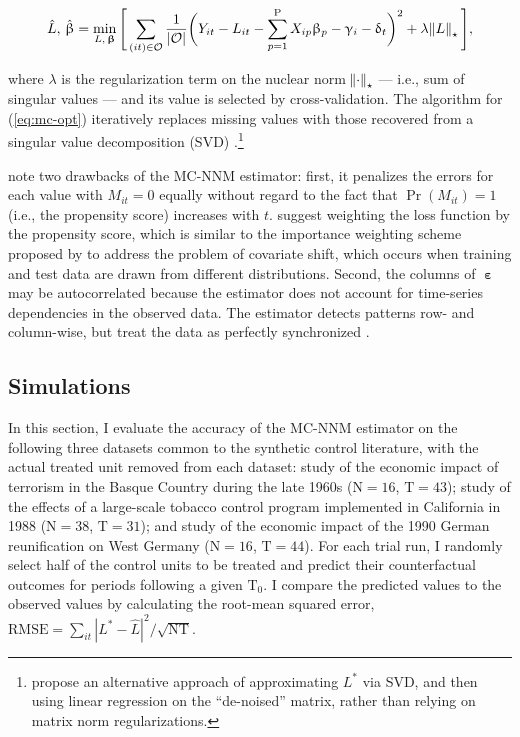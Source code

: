 \begin{equation}
\hat{L}, \, \hat{\upbeta} = \min_{L, \,\boldsymbol{\upbeta}} \Bigg[\sum_{(it) \in \mathcal{O}} \frac{1}{|\mathcal{O}|} \bigg(Y_{it} - L_{it} - \sum_{p=1}^{\text{P}} X_{ip} \upbeta_p - \upgamma_{i} - \updelta_{t} \bigg)^2 + \lambda \norm{L}_\star \Bigg], \label{eq:mc-opt}
\end{equation}

\noindent
where $\lambda$ is the regularization term on the nuclear norm $\norm{\cdot}_\star$ --- i.e., sum of singular values --- and its value is selected by cross-validation. The algorithm for (\ref{eq:mc-opt}) iteratively replaces missing values with those recovered from a singular value decomposition (SVD) \citep{mazumder2010spectral}.\footnote{\citet{amjad2018robust} propose an alternative approach of approximating $L^{*}$ via SVD, and then using linear regression on the ``de-noised'' matrix, rather than relying on matrix norm regularizations.}

\citet{athey2017matrix} note two drawbacks of the MC-NNM estimator: first, it penalizes the errors for each value with $M_{it} = 0$ equally without regard to the fact that $\Pr (M_{it}) = 1$ (i.e., the propensity score) increases with $t$. \citet{athey2017matrix} suggest weighting the loss function by the propensity score, which is similar to the importance weighting scheme proposed by \citet{cortes2008sample} to address the problem of covariate shift, which occurs when training and test data are drawn from different distributions. Second, the columns of $\boldsymbol{\upepsilon}$ may be autocorrelated because the estimator does not account for time-series dependencies in the observed data. The estimator detects patterns row- and column-wise, but treat the data as perfectly synchronized \citep{yoon2018estimating}. 

\subsection{Simulations} \label{sims}

In this section, I evaluate the accuracy of the MC-NNM estimator on the following three datasets common to the synthetic control literature, with the actual treated unit removed from each dataset:  study of the economic impact of terrorism in the Basque Country during the late 1960s ($\text{N}=16$, $\text{T}=43$);  study of the effects of a large-scale tobacco control program implemented in California in 1988 ($\text{N}=38$, $\text{T}=31$); and  study of the economic impact of the 1990 German reunification on West Germany ($\text{N}=16$, $\text{T}=44$). For each trial run, I randomly select half of the control units to be treated and predict their counterfactual outcomes for periods following a given $\text{T}_0$. I compare the predicted values to the observed values by calculating the root-mean squared error, $\text{RMSE} = \sum_{it}|L^{*} -\hat{L}|^2 / \sqrt{\text{NT}}$. 

